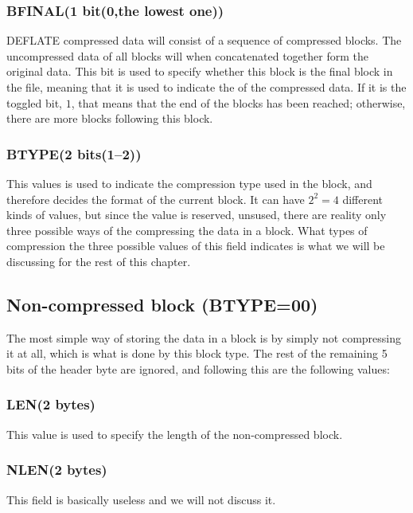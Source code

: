\subsubsection{BFINAL(1 bit(0,the lowest one))}

DEFLATE compressed data will consist of a sequence of compressed
blocks. The uncompressed data of all blocks will when concatenated
together form the original data. This bit is used to specify whether
this block is the final block in the file, meaning that it is used to
indicate the of the compressed data. If it is the toggled bit, $1$,
that means that the end of the blocks has been reached; otherwise,
there are more blocks following this block.

\subsubsection{BTYPE(2 bits(1--2))}

This values is used to indicate the compression type used in the
block, and therefore decides the format of the current block. It can
have $2^2 = 4$ different kinds of values, but since the value 
is reserved, unsused, there are reality only three possible ways of
the compressing the data in a block. What types of compression the
three possible values of this field indicates is what we will be
discussing for the rest of this chapter.

\subsection{Non-compressed block (BTYPE=00)}

The most simple way of storing the data in a block is by simply not
compressing it at all, which is what is done by this block type. The
rest of the remaining 5 bits of the header byte are ignored, and
following this are the following values:

\subsubsection{LEN(2 bytes)}

This value is used to specify the length of the non-compressed block.

\subsubsection{NLEN(2 bytes)}

This field is basically useless and we will not discuss it.

